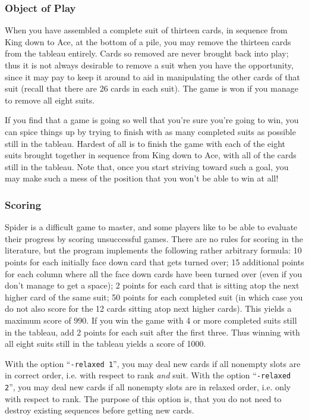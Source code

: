 \subsubsection*{Object of Play}
When you have assembled a complete suit of thirteen cards,
in sequence from King down to Ace, at the bottom of a pile, you may remove
the thirteen cards from the tableau entirely.  Cards so removed are never
brought back into play; thus it is not always desirable to remove a suit when
you have the opportunity, since it may pay to keep it
around to aid in manipulating the other cards of that suit (recall that there
are 26 cards in each suit).  The game is won if you manage to remove all
eight suits.

If you find that a game is going so well that you're sure you're going to
win, you can spice things up by trying to finish with as many completed suits
as possible still in the tableau.  Hardest of all is to finish the game with
each of the eight suits brought together in sequence from King down to Ace,
with all of the cards still in the tableau.  Note that, once you start
striving toward such a goal, you may make such a mess of the position that
you won't be able to win at all!

\subsubsection*{Scoring}
Spider is a difficult game to master, and some players like to be
able to evaluate their progress by scoring unsuccessful games.  There are no
rules for
scoring in the literature, but the program implements the following
rather arbitrary formula:  10 points for each initially face down card that
gets turned over; 15 additional points for each column where all the face
down cards have been turned over (even if you don't manage to get a space);
2 points for each card that is sitting atop the next higher card of the same
suit; 50 points for each completed suit (in which
case you do not also score for the 12 cards sitting atop next higher cards).
This yields a maximum score of 990.  If you win the game with 4 or more
completed suits still in the tableau, add 2 points for each suit after the
first three.  Thus winning with all eight suits still in the tableau yields
a score of 1000.

With the option ``{\tt -relaxed 1}'', you may deal new cards if
all nonempty slots are in correct order, i.e. with respect to rank {\em and}
suit. With the option ``{\tt -relaxed 2}'', you may deal new cards if
all nonempty slots are in relaxed order, i.e. only with respect to rank.
The purpose of this option is, that you do not need to destroy existing
sequences before getting new cards.

